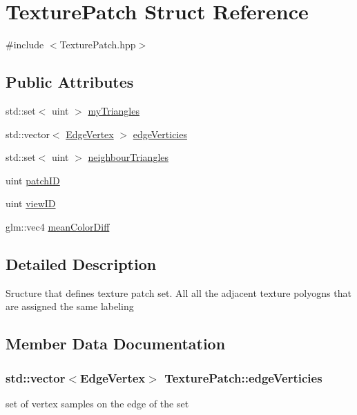 \hypertarget{struct_texture_patch}{}\section{Texture\+Patch Struct Reference}
\label{struct_texture_patch}


{\ttfamily \#include $<$Texture\+Patch.\+hpp$>$}

\subsection*{Public Attributes}
\begin{DoxyCompactItemize}
\item 
std\+::set$<$ uint $>$ \hyperlink{struct_texture_patch_a6508eab52b765ffa3f5b185956334f47}{my\+Triangles}
\item 
std\+::vector$<$ \hyperlink{struct_edge_vertex}{Edge\+Vertex} $>$ \hyperlink{struct_texture_patch_a93366f5b9cc0d02ba08ffb4fba64d977}{edge\+Verticies}
\item 
std\+::set$<$ uint $>$ \hyperlink{struct_texture_patch_a002b3455ab2599b42b78c34c1d887f94}{neighbour\+Triangles}
\item 
uint \hyperlink{struct_texture_patch_a359bb72c7d9793ff22e9d6272b016521}{patch\+I\+D}
\item 
uint \hyperlink{struct_texture_patch_a97acb0ad9531af6cc0c366640d3575e1}{view\+I\+D}
\item 
glm\+::vec4 \hyperlink{struct_texture_patch_a1285c94f40ae56464f33eaf69fb93617}{mean\+Color\+Diff}
\end{DoxyCompactItemize}


\subsection{Detailed Description}
Sructure that defines texture patch set. All all the adjacent texture polyogns that are assigned the same labeling 

\subsection{Member Data Documentation}
\hypertarget{struct_texture_patch_a93366f5b9cc0d02ba08ffb4fba64d977}{}
\subsubsection[{edge\+Verticies}]{\setlength{\rightskip}{0pt plus 5cm}std\+::vector$<${\bf Edge\+Vertex}$>$ Texture\+Patch\+::edge\+Verticies}\label{struct_texture_patch_a93366f5b9cc0d02ba08ffb4fba64d977}
set of vertex samples on the edge of the set \hypertarget{struct_texture_patch_a1285c94f40ae56464f33eaf69fb93617}{}
